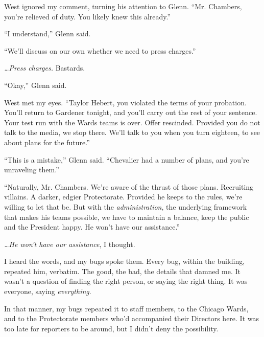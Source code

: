 West ignored my comment, turning his attention to Glenn.  ``Mr. Chambers, you're relieved of duty.  You likely knew this already.''



``I understand,'' Glenn said.



``We'll discuss on our own whether we need to press charges.''



\emph{\ldots{}Press charges.}  Bastards.



``Okay,'' Glenn said.



West met my eyes.  ``Taylor Hebert, you violated the terms of your probation.  You'll return to Gardener tonight, and you'll carry out the rest of your sentence.  Your test run with the Wards teams is over.  Offer rescinded.  Provided you do not talk to the media, we stop there.  We'll talk to you when you turn eighteen, to see about plans for the future.''



``This is a mistake,'' Glenn said.  ``Chevalier had a number of plans, and you're unraveling them.''



``Naturally, Mr. Chambers.  We're aware of the thrust of those plans.  Recruiting villains.  A darker, edgier Protectorate.  Provided he keeps to the rules, we're willing to let that be.  But with the \emph{administration}, the underlying framework that makes his teams possible, we have to maintain a balance, keep the public and the President happy.  He won't have our assistance.''



\emph{\ldots{}He won't have our assistance}, I thought.



I heard the words, and my bugs spoke them.  Every bug, within the building, repeated him, verbatim.  The good, the bad, the details that damned me.  It wasn't a question of finding the right person, or saying the right thing.  It was everyone, saying \emph{everything}.



In that manner, my bugs repeated it to staff members, to the Chicago Wards, and to the Protectorate members who'd accompanied their Directors here.  It was too late for reporters to be around, but I didn't deny the possibility.



